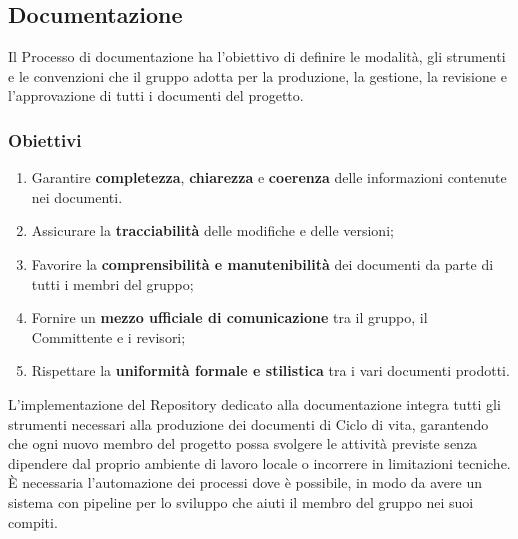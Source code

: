 \documentclass[a4paper,12pt]{article}
\begin{document}
\subsection{Documentazione} \label{sec:documentazione}
Il Processo di documentazione ha l’obiettivo di definire le modalità, gli strumenti e le convenzioni che il gruppo adotta per la produzione, la gestione, la revisione e l’approvazione di tutti i documenti del progetto.

\subsubsection{Obiettivi}
\begin{enumerate}
  \item Garantire \textbf{completezza}, \textbf{chiarezza} e \textbf{coerenza} delle informazioni contenute nei documenti.
  \item Assicurare la \textbf{tracciabilità} delle modifiche e delle versioni;
   \item Favorire la \textbf{comprensibilità e manutenibilità} dei documenti da parte di tutti i membri del gruppo;
   \item Fornire un \textbf{mezzo ufficiale di comunicazione} tra il gruppo, il Committente e i revisori;
   \item Rispettare la \textbf{uniformità formale e stilistica} tra i vari documenti prodotti.
\end{enumerate}
L’implementazione del Repository dedicato alla documentazione integra tutti gli strumenti necessari alla produzione dei documenti di Ciclo di vita, garantendo che ogni nuovo membro del progetto possa svolgere le attività previste senza dipendere dal proprio ambiente di lavoro locale o incorrere in limitazioni tecniche.\\È necessaria l'automazione dei processi dove è possibile, in modo da avere un sistema con pipeline per lo sviluppo che aiuti il membro del gruppo nei suoi compiti.
\end{document}
